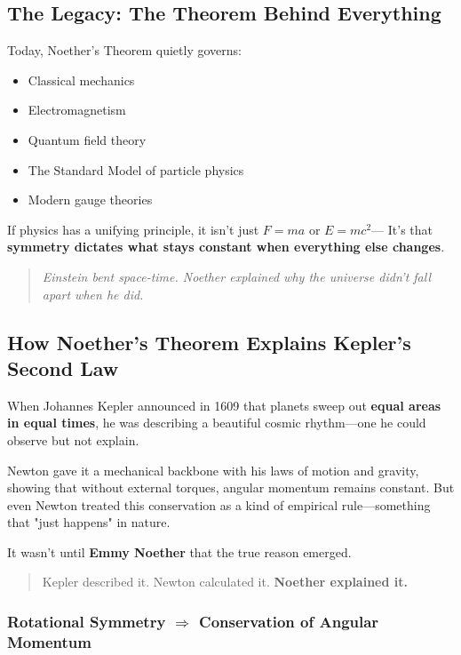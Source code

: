\subsection{The Legacy: The Theorem Behind Everything}

Today, Noether’s Theorem quietly governs:

\begin{itemize}
  \item Classical mechanics
  \item Electromagnetism
  \item Quantum field theory
  \item The Standard Model of particle physics
  \item Modern gauge theories
\end{itemize}

If physics has a unifying principle, it isn’t just \( F = ma \) or \( E = mc^2 \)—  
It’s that \textbf{symmetry dictates what stays constant when everything else changes}.

\begin{quote}
\textit{Einstein bent space-time.  
Noether explained why the universe didn’t fall apart when he did.}
\end{quote}

\subsection{How Noether’s Theorem Explains Kepler’s Second Law}

When Johannes Kepler announced in 1609 that planets sweep out \textbf{equal areas in equal times}, he was describing a beautiful cosmic rhythm—one he could observe but not explain.

Newton gave it a mechanical backbone with his laws of motion and gravity, showing that without external torques, angular momentum remains constant. But even Newton treated this conservation as a kind of empirical rule—something that "just happens" in nature.

It wasn’t until \textbf{Emmy Noether} that the true reason emerged.

\begin{quote}
Kepler described it.  
Newton calculated it.  
\textbf{Noether explained it.}
\end{quote}

\subsubsection*{Rotational Symmetry $\Rightarrow$ Conservation of Angular Momentum}

